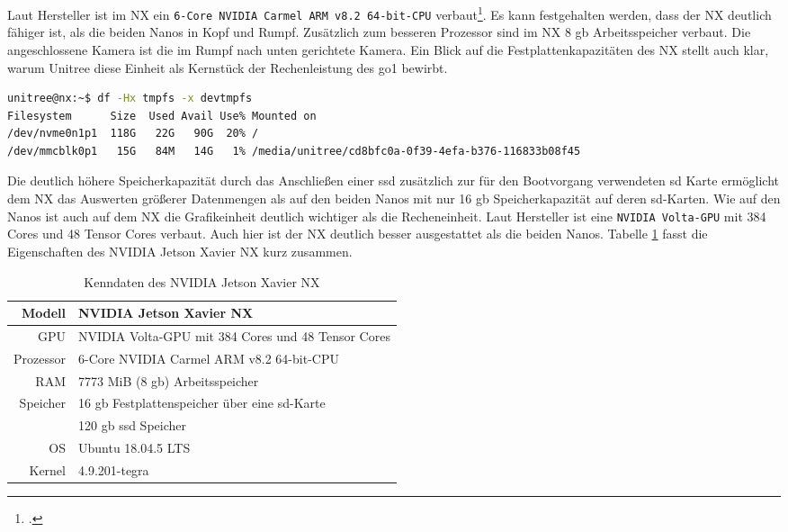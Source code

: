 Laut Hersteller ist im NX ein \texttt{6-Core NVIDIA Carmel ARM v8.2 64-\allowbreak bit-\allowbreak CPU} verbaut\footcite{nvidia_website_vergleich}.
Es kann festgehalten werden, dass der NX deutlich fähiger ist, als die beiden Nanos in Kopf und Rumpf.
Zusätzlich zum besseren Prozessor sind im NX \num{8} \gls{gb} Arbeitsspeicher verbaut.
Die angeschlossene Kamera ist die im Rumpf nach unten gerichtete Kamera.
Ein Blick auf die Festplattenkapazitäten des NX stellt auch klar, warum Unitree diese Einheit als Kernstück der Rechenleistung des
\gls{go1} bewirbt.

\begin{lstlisting}[language=sh, label=lst:nx-fs,columns=fixed]
unitree@nx:~$ df -Hx tmpfs -x devtmpfs
Filesystem      Size  Used Avail Use% Mounted on
/dev/nvme0n1p1  118G   22G   90G  20% /
/dev/mmcblk0p1   15G   84M   14G   1% /media/unitree/cd8bfc0a-0f39-4efa-b376-116833b08f45
\end{lstlisting}

Die deutlich höhere Speicherkapazität durch das Anschließen einer \gls{ssd} zusätzlich zur für den Bootvorgang verwendeten
\gls{sd} Karte ermöglicht dem NX das Auswerten größerer Datenmengen als auf den beiden Nanos mit nur \num{16} \gls{gb}
Speicherkapazität auf deren \gls{sd}-Karten.
Wie auf den Nanos ist auch auf dem NX die Grafikeinheit deutlich wichtiger als die Recheneinheit.
Laut Hersteller ist eine \texttt{NVIDIA Volta-GPU} mit 384 Cores und 48 Tensor Cores verbaut.
Auch hier ist der NX deutlich besser ausgestattet als die beiden Nanos.
Tabelle \ref{tab:data-nx} fasst die Eigenschaften des NVIDIA Jetson Xavier NX kurz zusammen.

\begin{table}[h]
    \centering
    \begin{tabularx}{\textwidth}{|r|X|}
        \hline
        Modell    & NVIDIA Jetson Xavier NX                                        \\ \hline
        GPU       & NVIDIA Volta-GPU mit 384 Cores und 48 Tensor Cores             \\ \hline
        Prozessor & 6-Core NVIDIA Carmel ARM v8.2 64-bit-CPU                       \\ \hline
        RAM       & \num{7773} MiB (\num{8} \gls{gb}) Arbeitsspeicher              \\ \hline
        Speicher  & \num{16} \gls{gb} Festplattenspeicher über eine \gls{sd}-Karte \\
        & \num{120} \gls{gb} \gls{ssd} Speicher                          \\ \hline
        OS        & Ubuntu 18.04.5 LTS                                             \\ \hline
        Kernel    & 4.9.201-tegra                                                  \\ \hline
    \end{tabularx}\caption{Kenndaten des NVIDIA Jetson Xavier NX}\label{tab:data-nx}
\end{table}

